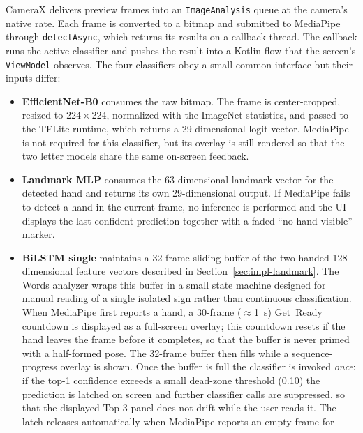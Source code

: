 CameraX delivers preview frames into an \texttt{ImageAnalysis}
queue at the camera's native rate. Each frame is converted to a
bitmap and submitted to MediaPipe through \texttt{detectAsync},
which returns its results on a callback thread. The callback runs
the active classifier and pushes the result into a Kotlin flow that
the screen's \texttt{ViewModel} observes. The four classifiers obey
a small common interface but their inputs differ:

\begin{itemize}
  \item \textbf{EfficientNet-B0} consumes the raw bitmap. The frame
        is center-cropped, resized to $224 \times 224$, normalized
        with the ImageNet statistics, and passed to the TFLite
        runtime, which returns a 29-dimensional logit vector.
        MediaPipe is not required for this classifier, but its
        overlay is still rendered so that the two letter models
        share the same on-screen feedback.
  \item \textbf{Landmark MLP} consumes the 63-dimensional landmark
        vector for the detected hand and returns its own
        29-dimensional output. If MediaPipe fails to detect a hand
        in the current frame, no inference is performed and the UI
        displays the last confident prediction together with a
        faded ``no hand visible'' marker.
  \item \textbf{BiLSTM single} maintains a 32-frame sliding buffer
        of the two-handed 128-dimensional feature vectors described
        in Section~\ref{sec:impl-landmark}. The Words analyzer
        wraps this buffer in a small state machine designed for
        manual reading of a single isolated sign rather than
        continuous classification. When MediaPipe first reports a
        hand, a 30-frame ($\approx$1~s) \textsf{Get~Ready}
        countdown is displayed as a full-screen overlay; this
        countdown resets if the hand leaves the frame before it
        completes, so that the buffer is never primed with a
        half-formed pose. The 32-frame buffer then fills while a
        sequence-progress overlay is shown. Once the buffer is full
        the classifier is invoked \emph{once}: if the top-1
        confidence exceeds a small dead-zone threshold (0.10) the
        prediction is latched on screen and further classifier
        calls are suppressed, so that the displayed Top-3 panel
        does not drift while the user reads it. The latch releases
        automatically when MediaPipe reports an empty frame for

\end{itemize}

